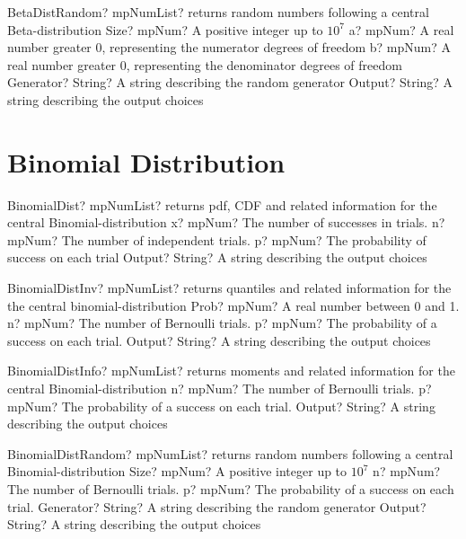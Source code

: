 \documentclass[12pt,a4paper,openany]{book}
\begin{document}
\begin{mpFunctionsExtract}
\mpFunctionFive
{BetaDistRandom? mpNumList? returns random numbers following a central Beta-distribution}
{Size? mpNum? A positive integer up to $10^7$}
{a? mpNum? A real number greater 0, representing the numerator  degrees of freedom}
{b? mpNum? A real number greater 0, representing the denominator degrees of freedom}
{Generator? String? A string describing the random generator}
{Output? String? A string describing the output choices}
\end{mpFunctionsExtract}

\section{Binomial Distribution}

\begin{mpFunctionsExtract}
\mpFunctionFour
{BinomialDist? mpNumList? returns pdf, CDF and related information for the central Binomial-distribution}
{x? mpNum? The number of successes in trials.}
{n? mpNum? The number of independent trials.}
{p? mpNum? The probability of success on each trial}
{Output? String? A string describing the output choices}
\end{mpFunctionsExtract}

\begin{mpFunctionsExtract}
\mpFunctionFour
{BinomialDistInv? mpNumList? returns quantiles and related information for the the central binomial-distribution}
{Prob? mpNum? A real number between 0 and 1.}
{n? mpNum? The number of Bernoulli trials.}
{p? mpNum? The probability of a success on each trial.}
{Output? String? A string describing the output choices}
\end{mpFunctionsExtract}

\begin{mpFunctionsExtract}
\mpFunctionThree
{BinomialDistInfo? mpNumList? returns moments and related information for the central Binomial-distribution}
{n? mpNum? The number of Bernoulli trials.}
{p? mpNum? The probability of a success on each trial.}
{Output? String? A string describing the output choices}
\end{mpFunctionsExtract}

\begin{mpFunctionsExtract}
\mpFunctionFive
{BinomialDistRandom? mpNumList? returns random numbers following a central Binomial-distribution}
{Size? mpNum? A positive integer up to $10^7$}
{n? mpNum? The number of Bernoulli trials.}
{p? mpNum? The probability of a success on each trial.}
{Generator? String? A string describing the random generator}
{Output? String? A string describing the output choices}
\end{mpFunctionsExtract}
\end{document}
